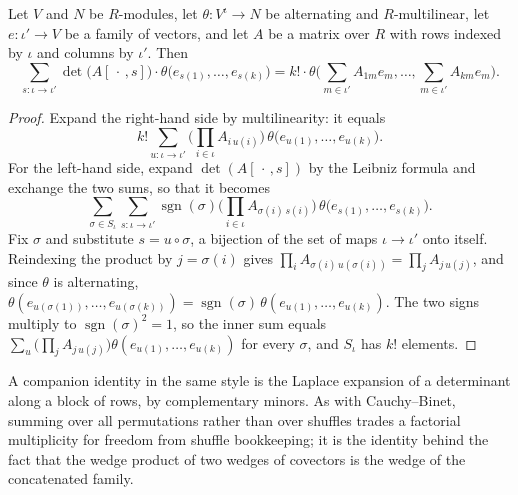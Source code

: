 \begin{lemma}
\label{lem:alternating-cauchy-binet}




Let $V$ and $N$ be $R$-modules, let $\theta \colon V^{\iota} \to N$ be alternating and $R$-multilinear, let $e \colon \iota' \to V$ be a family of vectors, and let $A$ be a matrix over $R$ with rows indexed by $\iota$ and columns by $\iota'$. Then
\[
\sum_{s \colon \iota \to \iota'} \det\big(A[\,\cdot\,, s]\big) \cdot \theta\big(e_{s(1)}, \ldots, e_{s(k)}\big) = k! \cdot \theta\Big(\sum_{m \in \iota'} A_{1m} e_m, \ldots, \sum_{m \in \iota'} A_{km} e_m\Big).
\]
\end{lemma}
\begin{proof}

Expand the right-hand side by multilinearity: it equals
\[
k! \sum_{u \colon \iota \to \iota'} \Big(\prod_{i \in \iota} A_{i\,u(i)}\Big)\,\theta\big(e_{u(1)}, \ldots, e_{u(k)}\big).
\]
For the left-hand side, expand $\det(A[\,\cdot\,, s])$ by the Leibniz formula and exchange the two sums, so that it becomes
\[
\sum_{\sigma \in S_\iota} \sum_{s \colon \iota \to \iota'} \operatorname{sgn}(\sigma)\Big(\prod_{i \in \iota} A_{\sigma(i)\,s(i)}\Big)\,\theta\big(e_{s(1)}, \ldots, e_{s(k)}\big).
\]
Fix $\sigma$ and substitute $s = u \circ \sigma$, a bijection of the set of maps $\iota \to \iota'$ onto itself. Reindexing the product by $j = \sigma(i)$ gives $\prod_{i} A_{\sigma(i)\,u(\sigma(i))} = \prod_{j} A_{j\,u(j)}$, and since $\theta$ is alternating, $\theta(e_{u(\sigma(1))}, \ldots, e_{u(\sigma(k))}) = \operatorname{sgn}(\sigma)\,\theta(e_{u(1)}, \ldots, e_{u(k)})$. The two signs multiply to $\operatorname{sgn}(\sigma)^2 = 1$, so the inner sum equals $\sum_{u} \big(\prod_{j} A_{j\,u(j)}\big)\theta(e_{u(1)}, \ldots, e_{u(k)})$ for every $\sigma$, and $S_\iota$ has $k!$ elements.
\end{proof}

A companion identity in the same style is the Laplace expansion of a determinant along a block of rows, by complementary minors. As with Cauchy--Binet, summing over all permutations rather than over shuffles trades a factorial multiplicity for freedom from shuffle bookkeeping; it is the identity behind the fact that the wedge product of two wedges of covectors is the wedge of the concatenated family.

